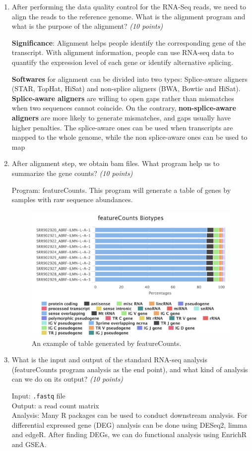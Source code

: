 \documentclass{article}
\begin{document}
\begin{enumerate}
    \item After performing the data quality control for the RNA-Seq reads, we need to align the reads to the reference genome. What is the alignment program and what is the purpose of the alignment? \emph{(10 points)}
    
    \textbf{Significance}: Alignment helps people identify the corresponding gene of the transcript. With alignment information, people can use RNA-seq data to quantify the expression level of each gene or identify alternative splicing. 
    
    \textbf{Softwares} for alignment can be divided into two types: Splice-aware aligners (STAR, TopHat, HiSat) and non-splice aligners (BWA, Bowtie and HiSat). 
    \textbf{Splice-aware aligners} are willing to open gaps rather than mismatches when two sequences cannot coincide. On the contrary, \textbf{non-splice-aware aligners} are more likely to generate mismatches, and gaps usually have higher penalties. The splice-aware ones can be used when transcripts are mapped to the whole genome, while the non splice-aware ones can be used to map 

    \item After alignment step, we obtain bam files. What program help us to summarize the gene counts? \emph{(10 points)}
    
    Program: featureCounts. This program will generate a table of genes by samples with raw sequence abundances.
    \begin{figure}[htbp]
        \centering
        \includegraphics[width=0.8\linewidth]{images/feature-count.png}
        \caption{An example of table generated by featureCounts.}
        \label{fig:feature}
    \end{figure}

    \item What is the input and output of the standard RNA-seq analysis (featureCounts program analysis as the end point), and what kind of analysis can we do on its output? \emph{(10 points)}
    
    Input: \texttt{.fastq} file\\
    Output: a read count matrix\\
    Analysis: Many R packages can be used to conduct downstream analysis. For differential expressed gene (DEG) analysis can be done using DESeq2, limma and edgeR. After finding DEGs, we can do functional analysis using EnrichR and GSEA.

\end{enumerate}
\end{document}
